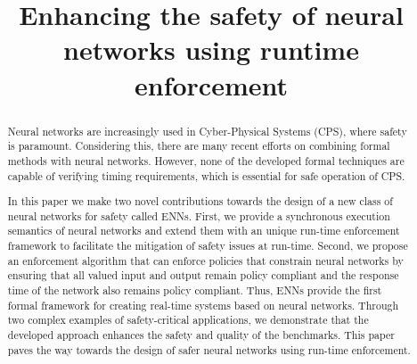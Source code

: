 \documentclass[sigconf]{acmart}
\begin{document}
\title{Enhancing the safety of neural networks using runtime enforcement}

\begin{abstract}
Neural networks are increasingly used in Cyber-Physical Systems (CPS),
where safety is paramount. Considering this, there are many recent
efforts on combining formal methods with neural networks. However,
none of the developed formal techniques are capable of verifying
timing requirements, which is essential for safe operation of CPS.

In this paper we make two novel contributions towards the design of a
new class of neural networks for safety called \acp{ENN}. First,
we provide a synchronous execution semantics of neural networks and
extend them with an unique run-time enforcement
framework to facilitate the mitigation of safety issues at
run-time. Second, we propose an enforcement algorithm that can
enforce policies that constrain neural networks by ensuring that all valued input and output remain policy
compliant and the response time of the network also remains policy
compliant. Thus, \acp{ENN} provide the first formal framework for
creating real-time systems based on neural networks.
Through two complex examples of safety-critical applications, we
demonstrate that the developed approach enhances the safety and quality
of the benchmarks. This paper paves the way towards the design of safer
neural networks using run-time enforcement.
\end{abstract}

\maketitle






%
%
%
%


%





\end{document}
